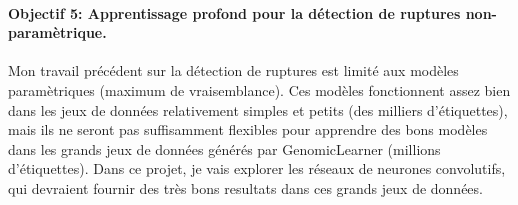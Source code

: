\documentclass{article}
\begin{document}
\paragraph{Objectif 5: Apprentissage profond pour la détection de
  ruptures non-paramètrique.} Mon travail précédent sur la détection
de ruptures est limité aux modèles paramètriques (maximum de
vraisemblance). Ces modèles fonctionnent assez bien dans les jeux
de données relativement simples et petits (des milliers d'étiquettes),
mais ils ne seront pas suffisamment flexibles pour
apprendre des bons modèles dans les grands jeux de données générés par
GenomicLearner (millions d'étiquettes). Dans ce projet, je vais
explorer les réseaux de neurones convolutifs, qui devraient fournir
des très bons resultats dans ces grands jeux de données.
 


\end{document}
